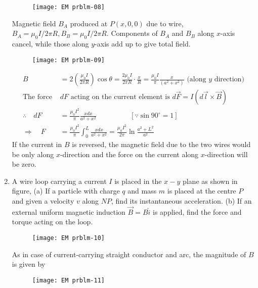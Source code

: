 \begin{enumerate}
\begin{figure}[H]
		\centering
		\texttt{[image: EM prblm-08]}
	\end{figure}
	\begin{answer}
			Magnetic field $B_{A}$ produced at $P(x, 0,0)$ due to wire, $B_{A}=\mu_{0} I / 2 \pi R, B_{B}=\mu_{0} I / 2 \pi R .$ Components of $B_{A}$ and $B_{B}$ along $x$-axis cancel, while those along $y$-axis add up to give total field.
			\begin{figure}[H]
				\centering
				\texttt{[image: EM prblm-09]}
			\end{figure}
		\begin{align*}
		B&=2\left(\frac{\mu_{0} I}{2 \pi R}\right) \cos \theta=\frac{2 \mu_{0} I}{2 \pi R} \cdot \frac{x}{R}=\frac{\mu_{0} I}{\pi} \frac{x}{\left(a^{2}+x^{2}\right)}\text{ (along $y$ direction)}\\
		\text{The force }&d F\text{ acting on the current element is }d \vec{F}=I(d \vec{l} \times \vec{B})\\
		\therefore \quad d F&=\frac{\mu_{0} I^{2}}{\pi} \frac{x d x}{a^{2}+x^{2}}\hspace{2cm}\left[\because \sin 90^{\circ}=1\right]\\
		\Rightarrow \quad F&=\frac{\mu_{0} I^{2}}{\pi} \int_{0}^{L} \frac{x d x}{a^{2}+x^{2}}=\frac{\mu_{0} I^{2}}{2 \pi} \ln \frac{a^{2}+L^{2}}{a^{2}}
		\end{align*}
		If the current in $B$ is reversed, the magnetic field due to the two wires would be only along $x$-direction and the force on the current along $x$-direction will be zero.
	\end{answer}
\item A wire loop carrying a current $I$ is placed in the $x-y$ plane as shown in figure, (a) If a particle with charge $q$ and mass $m$ is placed at the centre $P$ and given a velocity $v$ along $N P$, find its instantaneous acceleration. (b) If an external uniform magnetic induction $\vec{B}=B \hat{i}$ is applied, find the force and torque acting on the loop.
\begin{figure}[H]
	\centering
	\texttt{[image: EM prblm-10]}
\end{figure}
\begin{answer}
		As in case of current-carrying straight conductor and arc, the magnitude of $B$ is given by\\
		\begin{figure}[H]
			\centering
			\texttt{[image: EM prblm-11]}
		\end{figure}

\end{answer}
\end{enumerate}
